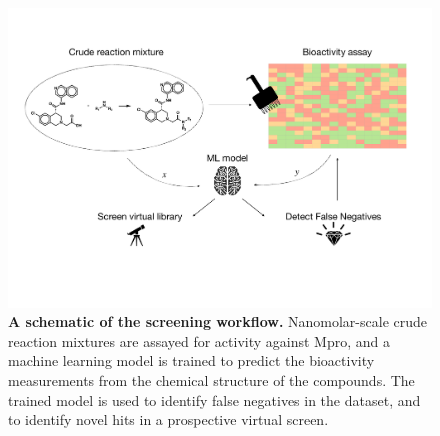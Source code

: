 
\begin{figure}[!t]
    \centering
    \includegraphics[width=\textwidth]{Chapters/Crude/Figs/schematic.pdf}
    \caption{\textbf{A schematic of the screening workflow.} Nanomolar-scale crude reaction mixtures are assayed for activity against Mpro, and a machine learning model is trained to predict the bioactivity measurements from the chemical structure of the compounds. The trained model is used to identify false negatives in the dataset, and to identify novel hits in a prospective virtual screen.}
    \label{fig:schematic}
\end{figure}

